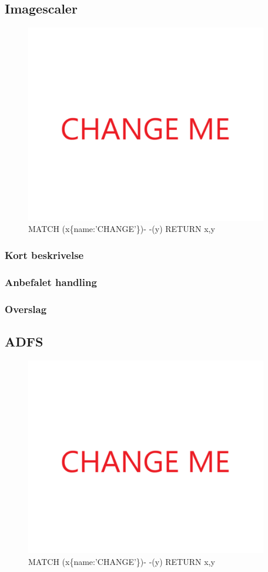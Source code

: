 \documentclass{article}
\begin{document}
\subsection{Imagescaler}
\begin{figure}[h]
\includegraphics[width=300pt]{CHANGE.PNG}
\caption{MATCH (x\{name:'CHANGE'\})- -(y) RETURN x,y}
\end{figure}
\subsubsection{Kort beskrivelse}
\subsubsection{Anbefalet handling}
\subsubsection{Overslag}
\subsection{ADFS}
\begin{figure}[h]
\includegraphics[width=300pt]{CHANGE.PNG}
\caption{MATCH (x\{name:'CHANGE'\})- -(y) RETURN x,y}
\end{figure}
\end{document}
